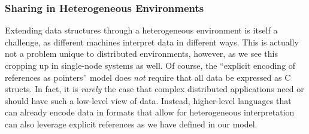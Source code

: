 {    \subsubsection{Sharing in Heterogeneous Environments}

    Extending data structures through a heterogeneous environment is itself a challenge, as different
    machines interpret data in different ways. This is actually not a problem unique to distributed
    environments, however, as we see this cropping up in single-node systems as well. Of course, the
    ``explicit encoding of references as pointers'' model does \emph{not} require that all data be
    expressed as C structs. In fact, it is \emph{rarely} the case that complex distributed applications
    need or should have such a low-level view of data. Instead, higher-level languages that can already
    encode data in formats that allow for heterogeneous interpretation can also leverage explicit
    references as we have defined in our model.
}


